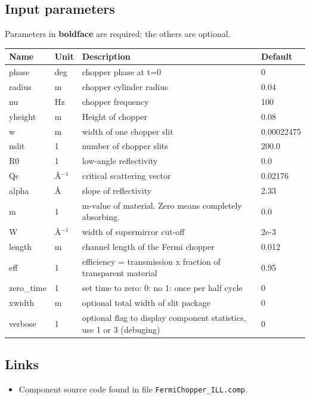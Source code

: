 \subsection*{Input parameters}
Parameters in \textbf{boldface} are required; the others are optional.

\begin{longtable}{p{}p{}p{}p{}}
\toprule
\textbf{Name} & \textbf{Unit} & \textbf{Description} & \textbf{Default} \\
\midrule
\endhead
phase & deg & chopper phase at t=0 & 0 \\
radius & m & chopper cylinder radius & 0.04 \\
nu & Hz & chopper frequency & 100 \\
yheight & m & Height of chopper & 0.08 \\
w & m & width of one chopper slit & 0.00022475 \\
nslit & 1 & number of chopper slits & 200.0 \\
R0 & 1 & low-angle reflectivity & 0.0 \\
Qc & \AA{}$^{-1}$ & critical scattering vector & 0.02176 \\
alpha & \AA{} & slope of reflectivity & 2.33 \\
m & 1 & m-value of material. Zero means completely absorbing. & 0.0 \\
W & \AA{}$^{-1}$ & width of supermirror cut-off & 2e-3 \\
length & m & channel length of the Fermi chopper & 0.012 \\
eff & 1 & efficiency = transmission x fraction of transparent material & 0.95 \\
zero\_time & 1 & set time to zero: 0: no  1: once per half cycle & 0 \\
xwidth & m & optional total width of slit package & 0 \\
verbose & 1 & optional flag to display component statistics, use 1 or 3 (debuging) & 0 \\
\bottomrule
\end{longtable}

\subsection*{Links}
\begin{itemize}
  \item Component source code found in file \texttt{FermiChopper\_ILL.comp}.
\end{itemize}
